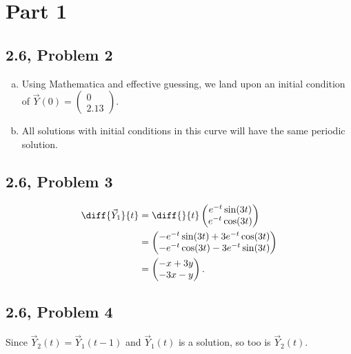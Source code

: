 \documentclass[10pt]{mypackage}
\begin{document}
\RaggedRight
\section{Part 1}%
\subsection{2.6, Problem 2}%
\begin{enumerate}[(a)]
  \item Using Mathematica and effective guessing, we land upon an initial condition of $\vec{Y}(0) = \begin{pmatrix}0\\2.13\end{pmatrix}$.
  \item All solutions with initial conditions in this curve will have the same periodic solution.
\end{enumerate}
\subsection{2.6, Problem 3}%
\begin{align*}
  \diff{\vec{Y}_1}{t} &= \diff{}{t} \begin{pmatrix}e^{-t}\sin(3t)\\e^{-t}\cos(3t)\end{pmatrix}\\
                      &= \begin{pmatrix}-e^{-t}\sin(3t) + 3e^{-t}\cos(3t) \\ -e^{-t}\cos(3t) - 3e^{-t}\sin(3t)\end{pmatrix}\\
                      &= \begin{pmatrix}-x+3y\\-3x-y\end{pmatrix}.
\end{align*}
\subsection{2.6, Problem 4}%
Since $\vec{Y}_2(t) = \vec{Y}_1\left(t-1\right)$ and $\vec{Y}_1(t)$  is a solution, so too is $\vec{Y}_2(t)$.
\end{document}
